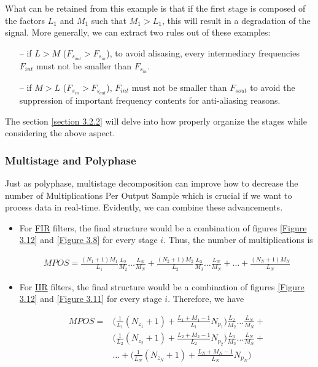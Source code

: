 \begin{itemize}
What can be retained from this example is that if the first stage is composed of the factors $L_1$ and  $M_1$ such that $M_1 > L_1$, this will result in a degradation of the signal. More generally, we can extract two rules out of these examples:
\begin{itemize}\label{3.1.4.2.conclusion}
	\item[--] if $L > M$ ($F_{s_{out}} > F_{s_{in}}$), to avoid alisasing, every intermediary frequencies $F_{int}$ must not be smaller than $F_{s_{in}}$.
	\item[--] if $M > L$ ($F_{s_{in}} > F_{s_{out}}$), $F_{int}$ must not be smaller than $F_{sout}$ to avoid the suppression of important frequency contents for anti-aliasing reasons. 
\end{itemize}
The section \ref{section 3.2.2} will delve into how properly organize the stages while considering the above aspect. 



\subsubsection{Multistage and Polyphase}

Just as polyphase, multistage decomposition can improve how to decrease the number of Multiplications Per Output Sample which is crucial if we want to process data in real-time. Evidently, we can combine these advancements. 

\begin{itemize}
	\item For \hyperlink{FIR}{FIR} filters, the final structure would be a combination of figures \ref{Figure 3.12} and \ref{Figure 3.8} for every stage $i$. Thus, the number of multiplications is 
	
	\begin{align}
		MPOS = \frac{(N_1 + 1)M_1}{L_1} \frac{L_2}{M_2}\dots\frac{L_N}{M_N} + \frac{(N_2 + 1)M_2}{L_2} \frac{L_3}{M_3}\dots \frac{L_N}{M_N} + \dots +\frac{(N_N + 1)M_N}{L_N} 
		\label{eqn:3.32}
	\end{align}
	\item For \hyperlink{IIR}{IIR} filters, the final structure would be a combination of figures \ref{Figure 3.12} and \ref{Figure 3.11} for every stage $i$. Therefore, we have
	
	\begin{align}\label{eqn:3.33}
	MPOS =& \Big (\frac{1}{L_1} (N_{z_1} +1) + \frac{L_1+M_1-1}{L_1} N_{p_1} \Big ) \frac{L_2}{M_2}\dots\frac{L_N}{M_N} +  \nonumber\\ 
	&\Big (\frac{1}{L_2} (N_{z_2} +1) + \frac{L_2+M_2-1}{L_2} N_{p_2} \Big ) \frac{L_3}{M_3}\dots \frac{L_N}{M_N} + \\\nonumber
	&\dots +\Big (\frac{1}{L_N} (N_{z_N} +1) + \frac{L_N+M_N-1}{L_N} N_{p_N} \Big ) 
	\end{align}
	
	
	
	 
\end{itemize}


\end{itemize}

